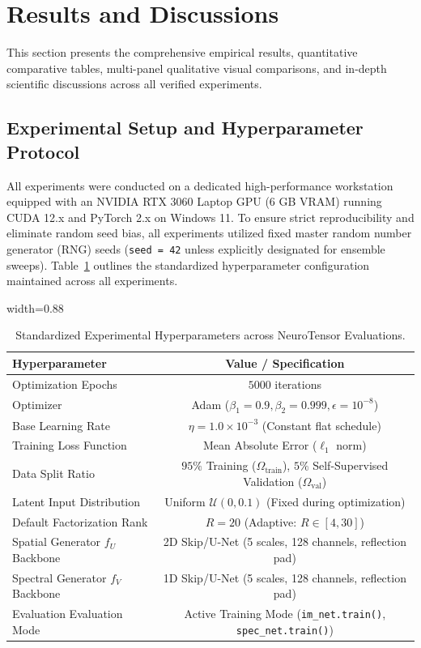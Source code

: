 \section{Results and Discussions}
\label{sec:results_discussion}

This section presents the comprehensive empirical results, quantitative comparative tables, multi-panel qualitative visual comparisons, and in-depth scientific discussions across all verified experiments.

\subsection{Experimental Setup and Hyperparameter Protocol}
\label{subsec:exp_setup}
All experiments were conducted on a dedicated high-performance workstation equipped with an NVIDIA RTX 3060 Laptop GPU (6 GB VRAM) running CUDA 12.x and PyTorch 2.x on Windows 11. To ensure strict reproducibility and eliminate random seed bias, all experiments utilized fixed master random number generator (RNG) seeds (\texttt{seed = 42} unless explicitly designated for ensemble sweeps). Table~\ref{tab:hyperparameters} outlines the standardized hyperparameter configuration maintained across all experiments.

\begin{table}[htbp]
\centering
\caption{Standardized Experimental Hyperparameters across NeuroTensor Evaluations.}
\label{tab:hyperparameters}
\begin{adjustbox}{width=0.88\textwidth}
\begin{tabular}{lc}
\toprule
\textbf{Hyperparameter} & \textbf{Value / Specification} \\
\midrule
Optimization Epochs & $5000$ iterations \\
Optimizer & Adam ($\beta_1 = 0.9, \beta_2 = 0.999, \epsilon = 10^{-8}$) \\
Base Learning Rate & $\eta = 1.0 \times 10^{-3}$ (Constant flat schedule) \\
Training Loss Function & Mean Absolute Error ($\ell_1$ norm) \\
Data Split Ratio & $95\%$ Training ($\Omega_\text{train}$), $5\%$ Self-Supervised Validation ($\Omega_\text{val}$) \\
Latent Input Distribution & Uniform $\mathcal{U}(0, 0.1)$ (Fixed during optimization) \\
Default Factorization Rank & $R = 20$ (Adaptive: $R \in [4, 30]$) \\
Spatial Generator $f_U$ Backbone & 2D Skip/U-Net (5 scales, 128 channels, reflection pad) \\
Spectral Generator $f_V$ Backbone & 1D Skip/U-Net (5 scales, 128 channels, reflection pad) \\
Evaluation Evaluation Mode & Active Training Mode (\texttt{im\_net.train()}, \texttt{spec\_net.train()}) \\
\bottomrule
\end{tabular}
\end{adjustbox}
\end{table}

